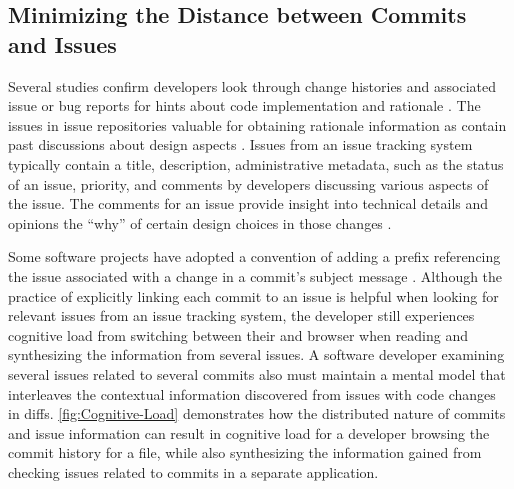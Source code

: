 \subsection{Minimizing the Distance between Commits and Issues}
\label{subsec:Minimize-Commit-Issue-Distance}

Several studies confirm developers look through change histories and associated issue 
or bug reports for hints about code implementation and rationale \cite{ko_information_2007,robillard_turnover-induced_2021, rastkar_why_2013}.
The issues in issue repositories  valuable for obtaining rationale information 
as  contain past discussions about design aspects \cite{brunet_design_2014,hassan_road_2008}.
Issues from an issue tracking system typically contain a title, 
description, administrative metadata, such as the status of an issue, priority, 
and comments by developers discussing various aspects of the issue.
The comments for an issue provide insight into technical details 
and opinions  the ``why'' of certain design choices in those changes \cite{ortu_jira_2015}.

Some software projects have adopted a convention of adding a prefix referencing 
the issue associated with a change in a commit's subject message \cite{rastkar_why_2013,moreno_arena_2017}.
Although the practice of explicitly linking each commit to an issue is helpful when looking for relevant issues from an issue tracking system, 
the developer still experiences cognitive load from switching between their  and browser when reading and synthesizing the information from several issues.
A software developer examining several issues related to several commits also must maintain a mental model that interleaves the contextual information discovered from issues with code changes in diffs.
\autoref{fig:Cognitive-Load} demonstrates how the distributed nature of commits and issue information can result in cognitive load for a developer browsing the commit history for a file, while also synthesizing the information gained from checking issues related to commits in a separate application.

